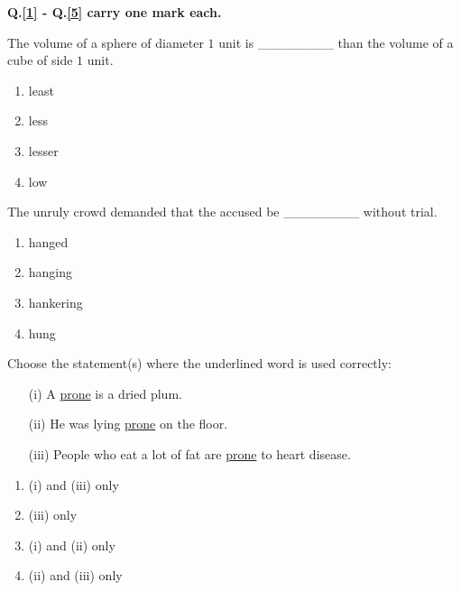 \item[] \textbf{Q.\ref{1} - Q.\ref{5} carry one mark each.}
    \item \label{1} The volume of a sphere of diameter $1$ unit is \_\_\_\_\_\_\_\_ than the volume of a cube of side $1$ unit.
        \begin{enumerate}
            \item least
            \item less
            \item lesser
            \item low
        \end{enumerate}

    \item The unruly crowd demanded that the accused be \_\_\_\_\_\_\_\_ without trial.
        \begin{enumerate}
            \item hanged
            \item hanging
            \item hankering
            \item hung
        \end{enumerate}

    \item Choose the statement(s) where the underlined word is used correctly:
        \begin{itemize}
            \item[(i)] A \underline{prone} is a dried plum.
            \item[(ii)] He was lying \underline{prone} on the floor.
            \item[(iii)] People who eat a lot of fat are \underline{prone} to heart disease.
        \end{itemize}
        \begin{enumerate}
            \item (i) and (iii) only
            \item (iii) only
            \item (i) and (ii) only
            \item (ii) and (iii) only
        \end{enumerate}

